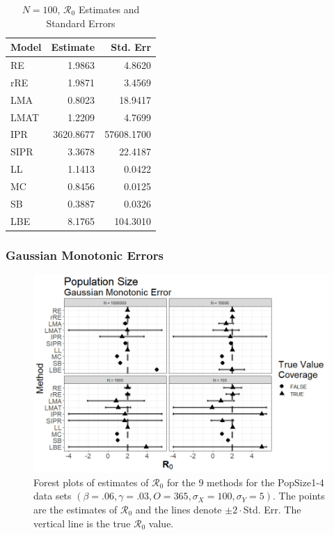 \documentclass[12pt]{article}
\newcommand{\xxsir}{\ensuremath{9} } %
\newcommand{\rr}{\ensuremath{\mathcal{R}_0}}
\begin{document}
\begin{table}[H]
	
	\centering
	\begin{tabular}[t]{l|r|r}
		\hline
		Model & Estimate & Std. Err\\
		\hline
		RE & 1.9863 & 4.8620\\
		\hline
		rRE & 1.9871 & 3.4569\\
		\hline
		LMA & 0.8023 & 18.9417\\
		\hline
		LMAT & 1.2209 & 4.7699\\
		\hline
		IPR & 3620.8677 & 57608.1700\\
		\hline
		SIPR & 3.3678 & 22.4187\\
		\hline
		LL & 1.1413 & 0.0422\\
		\hline
		MC & 0.8456 & 0.0125\\
		\hline
		SB & 0.3887 & 0.0326\\
		\hline
		LBE & 8.1765 & 104.3010\\
		\hline
	\end{tabular}
\caption{$N = 100$, $\rr$ Estimates and Standard Errors}\label{tab:n2-res2}
\end{table}

\subsubsection{Gaussian Monotonic Errors}

\begin{figure}[H]
	\centering
	\includegraphics[scale=0.5]{images/popsize_nm.jpg}
	\caption{Forest plots of estimates of $\rr$ for the \xxsir methods for the PopSize1-4 data sets $(\beta=.06, \gamma=.03, O=365, \sigma_X=100, \sigma_Y=5)$.  The points are the estimates of $\rr$ and the lines denote $\pm 2\cdot $Std. Err.  The vertical line is the true $\rr$ value.}
\end{figure}
\end{document}
